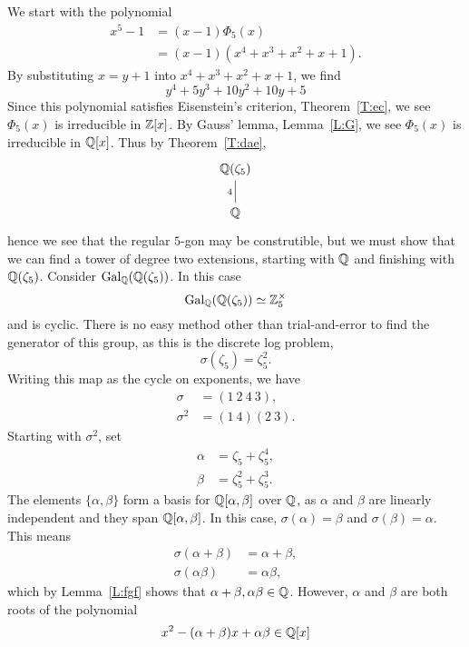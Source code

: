 \documentclass{ximera}
\begin{document}
\begin{example}
  We start with the polynomial
  \begin{align*}
    x^{5} -1 &= (x-1) \Phi_{5}(x)\\
    &= (x-1)(x^{4} + x^{3} + x^2 + x+1).
  \end{align*}
  By substituting $x=y+1$ into $x^{4} + x^3 +x^2 + x+1$, we find
  \[
  y^{4} +5y^3+10y^2+10y+5
  \]
  Since this polynomial satisfies Eisenstein's criterion,
  Theorem~\ref{T:ec}, we see $\Phi_5(x)$ is irreducible in $\mathbb Z[x]$. By
  Gauss' lemma, Lemma~\ref{L:G}, we see $\Phi_5(x)$ is irreducible in
  $\mathbb Q[x]$. Thus by Theorem~\ref{T:dae}, 
  \[
  \begin{tikzcd}
    \Q(\zeta_{5})\\
    \Q\ar[u, -, "4"]
  \end{tikzcd}
  \]
  hence we see that the regular $5$-gon may be construtible, but we
  must show that we can find a tower of degree two extensions,
  starting with $\mathbb Q$ and finishing with $\mathbb Q(\zeta_{5})$.  Consider
  $\operatorname{Gal}_{\mathbb Q}(\mathbb Q(\zeta_{5}))$. In this case
  \[
  \operatorname{Gal}_{\mathbb Q}(\mathbb Q(\zeta_{5}))\simeq \mathbb Z_{5}^\times
  \]
  and is cyclic. There is no easy method other than trial-and-error to
  find the generator of this group, as this is the discrete log
  problem,
  \[
  \sigma(\zeta_{5}) = \zeta_{5}^2.
  \]
  Writing this map as the cycle on exponents, we have
  \begin{align*}
    \sigma &= (1\ 2\ 4\ 3),\\
    \sigma^2 &= (1\ 4)(2\ 3).
  \end{align*}
  Starting with $\sigma^2$, set
  \begin{align*}
    \alpha &= \zeta_{5}   + \zeta_{5}^4,\\
    \beta &= \zeta_{5}^2 + \zeta_{5}^{3}.
  \end{align*}
  The elements $\{\alpha,\beta\}$ form a basis for $\mathbb Q[\alpha,\beta]$ over
  $\mathbb Q$, as $\alpha$ and $\beta$ are linearly independent and they span
  $\mathbb Q[\alpha,\beta]$. In this case, $\sigma(\alpha) = \beta$ and
  $\sigma(\beta) = \alpha$. This means
  \begin{align*}
    \sigma(\alpha+\beta) &= \alpha + \beta,\\
    \sigma(\alpha\beta) &= \alpha\beta,
  \end{align*}
  which by Lemma~\ref{L:fgf} shows that
  $\alpha+\beta,\alpha\beta\in\mathbb Q$. However, $\alpha$ and $\beta$ are
  both roots of the polynomial
  \[
  x^2 - (\alpha +\beta) x + \alpha\beta\in\mathbb Q[x]
\]
\end{example}
\end{document}
